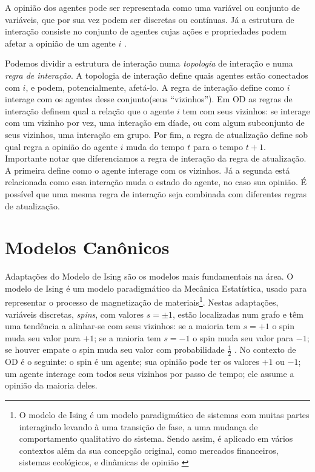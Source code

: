   A opinião dos agentes pode ser representada como uma variável ou conjunto de
  variáveis, que por sua vez podem ser discretas ou contínuas. Já a estrutura de
  interação consiste no conjunto de agentes cujas ações e propriedades podem
  afetar a opinião de um agente \(i\) \cite{page2008uncertainty}.

  Podemos dividir a estrutura de interação numa \textit{topologia} de interação
  e numa \textit{regra de interação}. A topologia de interação define quais
  agentes estão conectados com \(i\), e podem, potencialmente, afetá-lo. A regra
  de interação define como \(i\) interage com os agentes desse conjunto(seus
  ``vizinhos''). Em OD as regras de interação definem qual a relação que o
  agente \(i\) tem com seus vizinhos: se interage com um vizinho por vez, uma
  interação em díade, ou com algum subconjunto de seus vizinhos, uma interação
  em grupo. Por fim, a regra de atualização define sob qual regra a opinião do
  agente \(i\) muda do tempo \(t\) para o tempo \(t+1\). Importante notar que
  diferenciamos a regra de interação da regra de atualização. A primeira define
  como o agente interage com os vizinhos. Já a segunda está relacionada como
  essa interação muda o estado do agente, no caso sua opinião. É possível que
  uma mesma regra de interação seja combinada com diferentes regras de
  atualização.

  
  \section{Modelos Canônicos}

  Adaptações do Modelo de Ising são os modelos mais fundamentais na área. O
  modelo de Ising é um modelo paradigmático da Mecânica Estatística, usado para
  representar o processo de magnetização de materiais\footnote{O modelo de Ising
    é um modelo paradigmático de sistemas com muitas partes interagindo levando
    à uma transição de fase, a uma mudança de comportamento qualitativo do
    sistema. Sendo assim, é aplicado em vários contextos além da sua concepção
    original, como mercados financeiros, sistemas ecológicos, e dinâmicas de
    opinião \cite{sole2011phase}}. Nestas adaptações, variáveis discretas,
  \textit{spins}, com valores $s = \pm 1$, estão localizadas num grafo e têm uma
  tendência a alinhar-se com seus vizinhos: se a maioria tem \(s = + 1 \) o spin
  muda seu valor para \(+1\); se a maioria tem \(s = -1 \) o spin muda seu valor
  para \(-1\); se houver empate o spin muda seu valor com probabilidade
  \(\frac{1}{2}\) \cite{castellano2012social,sole2011phase}. No contexto de OD é
  o seguinte: o spin é um agente; sua opinião pode ter os valores \(+1\) ou
  \(-1\); um agente interage com todos seus vizinhos por passo de tempo; ele
  assume a opinião da maioria deles.

